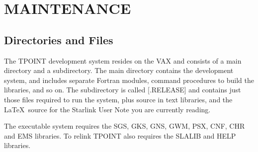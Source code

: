 \section{MAINTENANCE}
\subsection{Directories and Files}
The TPOINT development system resides on the VAX and consists of
a main directory and a subdirectory.  The
main directory contains the development system, and includes
separate Fortran modules, command procedures to build the libraries,
and so on.  The subdirectory is called [.RELEASE] and contains just
those files required to run the system, plus source in text libraries,
and the \LaTeX\ source for the Starlink User Note you are
currently reading.

The executable system requires the SGS, GKS, GNS, GWM, PSX, CNF,
CHR and EMS libraries.  To relink TPOINT also requires the SLALIB
and HELP libraries.

